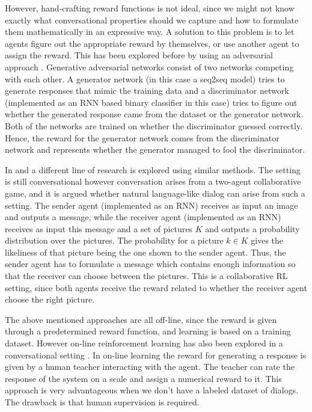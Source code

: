 \documentclass[12pt]{article}
\begin{document}
However, hand-crafting reward functions is not ideal, since we might not know exactly what conversational properties should we capture and how to formulate them mathematically in an expressive way. A solution to this problem is to let agents figure out the appropriate reward by themselves, or use another agent to assign the reward. This has been explored before by using an adversarial approach \cite{Li_adversarial:2017}. Generative adversarial networks \cite{Goodfellow:2014} consist of two networks competing with each other. A generator network (in this case a seq2seq model) tries to generate responses that mimic the training data and a discriminator network (implemented as an RNN based binary classifier in this case) tries to figure out whether the generated response came from the dataset or the generator network. Both of the networks are trained on whether the discriminator guessed correctly. Hence, the reward for the generator network comes from the discriminator network and represents whether the generator managed to fool the discriminator.

In \cite{Havrylov:2017} and \cite{Kottur:2017} a different line of research is explored using similar methods. The setting is still conversational however conversation arises from a two-agent collaborative game, and it is argued whether natural language-like dialog can arise from such a setting. The sender agent (implemented as an RNN) receives as input an image and outputs a message, while the receiver agent (implemented as an RNN) receives as input this message and a set of pictures \(K\) and outputs a probability distribution over the pictures. The probability for a picture \(k\in K\) gives the likeliness of that picture being the one shown to the sender agent. Thus, the sender agent has to formulate a message which contains enough information so that the receiver can choose between the pictures. This is a collaborative RL setting, since both agents receive the reward related to whether the receiver agent choose the right picture.

The above mentioned approaches are all off-line, since the reward is given through a predetermined reward function, and learning is based on a training dataset. However on-line reinforcement learning has also been explored in a conversational setting \cite{Li_HIL:2016}. In on-line learning the reward for generating a response is given by a human teacher interacting with the agent. The teacher can rate the response of the system on a scale and assign a numerical reward to it. This approach is very advantageous when we don't have a labeled dataset of dialogs. The drawback is that human supervision is required.
\end{document}
